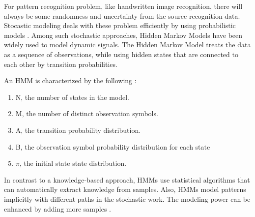 
For pattern recognition problem, like handwritten image recognition, there will  always be some randomness and uncertainty from the source recognition data. Stocastic modeling deals with these problem efficiently by using probabilistic models \cite{Cho1995}.  Among such stochastic approaches, Hidden Markov Models have been widely used to model dynamic signals.
The Hidden Markov Model treats the data as a sequence of observations, while using hidden states that are connected to each other by transition probabilities.
 
An HMM is characterized by the following \cite{Rabiner1989}:
\begin{enumerate}
\item	N, the number of states in the model.
\item	M, the number of distinct observation symbols. %
\item	A, the transition probability distribution.
\item	B, the observation symbol probability distribution for each state
\item	$\pi$, the initial state state distribution.
\end{enumerate}

In contrast to a knowledge-based approach, HMMs use statistical algorithms that can automatically extract knowledge from samples. 
Also, HMMs model patterns implicitly with different paths in the stochastic work. 
The modeling power can be enhanced by adding more samples \cite{Cho1995}.
